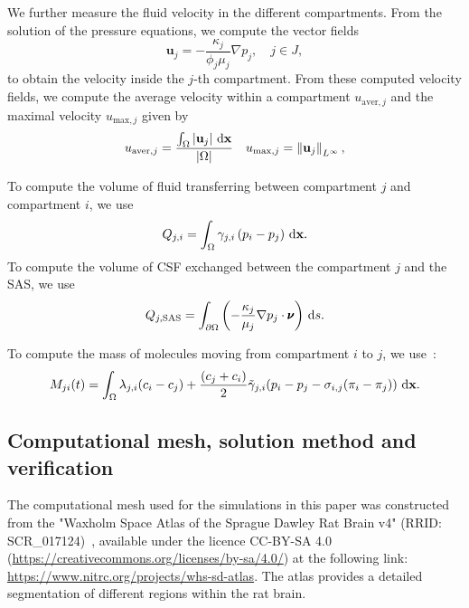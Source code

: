 \documentclass[10pt]{article}
\newcommand{\1}{^{(1)}}
\newcommand{\2}{^{(2)}}
\newcommand*{\dd}{\mathop{\kern0pt\mathrm{d}}\!{}}
\newcommand{\norm}[1]{\left\lVert#1\right\rVert}
\newcommand {\x}   {\mathbf{x}}
\begin{document}
We further measure the fluid velocity in the different compartments. From the solution of the pressure equations, we compute the vector fields
\begin{equation}
    \mathbf u_j = -\frac{\kappa_j}{\phi_j \mu_j}\nabla p_j, \quad j\in J, 
    \label{eq:velo}
\end{equation}
to obtain the velocity inside the $j$-th compartment. 
From these computed velocity fields, we compute the average velocity within a compartment $u_{\text{aver},j}$ and the maximal velocity $u_{\text{max},j}$ given by 
\begin{equation}
u_{\text{aver},j} = \frac{\int_\Omega | \mathbf u_j | \, \dd \x}{| \Omega |}\quad u_{\text{max},j} = \norm{ \mathbf u_j }_{L^\infty},
\end{equation}

To compute the volume of fluid transferring between compartment $j$ and compartment $i$, we use
\begin{equation}
Q_{j,i} = \int_{\Omega}  \gamma_{j , i} \left( p_i - p_j \right)\, \dd \x.
\label{eq:compute-transfer}
\end{equation}
To compute the volume of CSF exchanged between the compartment $j$ and the SAS, we use 
\begin{equation}
Q_{j,\text{SAS}} = \int_{\partial \Omega} \left(- \frac{\kappa_j}{ \mu_j}\nabla p_j  \cdot\pmb{\nu}\right) \,\dd s.\label{eq:compute-transfer-SAS}
\end{equation}


To compute the mass of molecules moving from compartment $i$ to $j$, we use~\cite{jarzynska2006application}: 
\begin{equation}
    M_{ji}(t) = \int_\Omega  \lambda_{j, i}( c_i- c_j) +  \frac{(c_j+c_i)}{2} \tilde \gamma_{j , i} (p_i - p_j-\sigma_{i,j}(\pi_i-\pi_j))  \, \dd \x.
    \label{eq:matrixM}
\end{equation}
\subsection{Computational mesh, solution method and verification} \label{section: mesh}
The computational mesh used for the simulations in this paper was constructed from the "Waxholm Space Atlas of the Sprague Dawley Rat Brain v4" (RRID: \textsf{SCR\_017124})~\cite{papp2014, atlasv4}, available under the licence CC-BY-SA 4.0 (\url{https://creativecommons.org/licenses/by-sa/4.0/}) at the following link: \url{https://www.nitrc.org/projects/whs-sd-atlas}. The atlas provides a detailed segmentation of different regions within the rat brain. 
\end{document}
